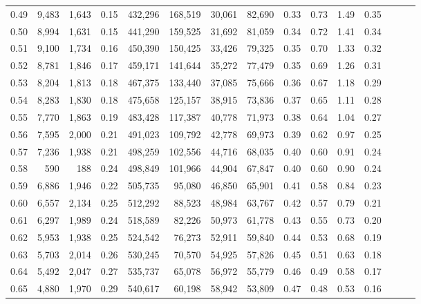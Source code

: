 \begin{tabular}{rrrrrrrrrrrrrrr}
0.49 &   9,483 &  1,643 &  0.15 &  432,296 &  168,519 &   30,061 &   82,690 &  0.33 &  0.73 &  1.49 &      0.35 \\
0.50 &   8,994 &  1,631 &  0.15 &  441,290 &  159,525 &   31,692 &   81,059 &  0.34 &  0.72 &  1.41 &      0.34 \\
0.51 &   9,100 &  1,734 &  0.16 &  450,390 &  150,425 &   33,426 &   79,325 &  0.35 &  0.70 &  1.33 &      0.32 \\
0.52 &   8,781 &  1,846 &  0.17 &  459,171 &  141,644 &   35,272 &   77,479 &  0.35 &  0.69 &  1.26 &      0.31 \\
0.53 &   8,204 &  1,813 &  0.18 &  467,375 &  133,440 &   37,085 &   75,666 &  0.36 &  0.67 &  1.18 &      0.29 \\
0.54 &   8,283 &  1,830 &  0.18 &  475,658 &  125,157 &   38,915 &   73,836 &  0.37 &  0.65 &  1.11 &      0.28 \\
0.55 &   7,770 &  1,863 &  0.19 &  483,428 &  117,387 &   40,778 &   71,973 &  0.38 &  0.64 &  1.04 &      0.27 \\
0.56 &   7,595 &  2,000 &  0.21 &  491,023 &  109,792 &   42,778 &   69,973 &  0.39 &  0.62 &  0.97 &      0.25 \\
0.57 &   7,236 &  1,938 &  0.21 &  498,259 &  102,556 &   44,716 &   68,035 &  0.40 &  0.60 &  0.91 &      0.24 \\
0.58 &     590 &    188 &  0.24 &  498,849 &  101,966 &   44,904 &   67,847 &  0.40 &  0.60 &  0.90 &      0.24 \\
0.59 &   6,886 &  1,946 &  0.22 &  505,735 &   95,080 &   46,850 &   65,901 &  0.41 &  0.58 &  0.84 &      0.23 \\
0.60 &   6,557 &  2,134 &  0.25 &  512,292 &   88,523 &   48,984 &   63,767 &  0.42 &  0.57 &  0.79 &      0.21 \\
0.61 &   6,297 &  1,989 &  0.24 &  518,589 &   82,226 &   50,973 &   61,778 &  0.43 &  0.55 &  0.73 &      0.20 \\
0.62 &   5,953 &  1,938 &  0.25 &  524,542 &   76,273 &   52,911 &   59,840 &  0.44 &  0.53 &  0.68 &      0.19 \\
0.63 &   5,703 &  2,014 &  0.26 &  530,245 &   70,570 &   54,925 &   57,826 &  0.45 &  0.51 &  0.63 &      0.18 \\
0.64 &   5,492 &  2,047 &  0.27 &  535,737 &   65,078 &   56,972 &   55,779 &  0.46 &  0.49 &  0.58 &      0.17 \\
0.65 &   4,880 &  1,970 &  0.29 &  540,617 &   60,198 &   58,942 &   53,809 &  0.47 &  0.48 &  0.53 &      0.16 \\

\end{tabular}
